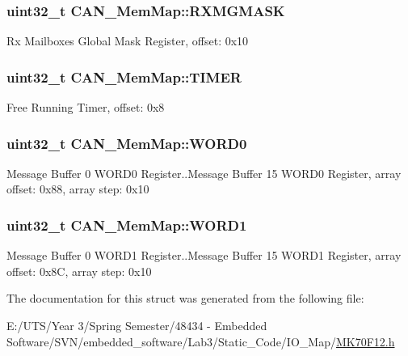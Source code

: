 \subsubsection[{R\+X\+M\+G\+M\+A\+S\+K}]{\setlength{\rightskip}{0pt plus 5cm}uint32\+\_\+t C\+A\+N\+\_\+\+Mem\+Map\+::\+R\+X\+M\+G\+M\+A\+S\+K}\label{struct_c_a_n___mem_map_aa788d49d34c42aeb411ed6b43f1a7c42}
Rx Mailboxes Global Mask Register, offset\+: 0x10 \hypertarget{struct_c_a_n___mem_map_a7cdd012a6030c4bf528cec65fddb71ca}{}
\subsubsection[{T\+I\+M\+E\+R}]{\setlength{\rightskip}{0pt plus 5cm}uint32\+\_\+t C\+A\+N\+\_\+\+Mem\+Map\+::\+T\+I\+M\+E\+R}\label{struct_c_a_n___mem_map_a7cdd012a6030c4bf528cec65fddb71ca}
Free Running Timer, offset\+: 0x8 \hypertarget{struct_c_a_n___mem_map_ac2b68cfbc9aeab141d20ae8bd73cd169}{}
\subsubsection[{W\+O\+R\+D0}]{\setlength{\rightskip}{0pt plus 5cm}uint32\+\_\+t C\+A\+N\+\_\+\+Mem\+Map\+::\+W\+O\+R\+D0}\label{struct_c_a_n___mem_map_ac2b68cfbc9aeab141d20ae8bd73cd169}
Message Buffer 0 W\+O\+R\+D0 Register..Message Buffer 15 W\+O\+R\+D0 Register, array offset\+: 0x88, array step\+: 0x10 \hypertarget{struct_c_a_n___mem_map_ae9343e0c532c0f3784d9960ffb8aa229}{}
\subsubsection[{W\+O\+R\+D1}]{\setlength{\rightskip}{0pt plus 5cm}uint32\+\_\+t C\+A\+N\+\_\+\+Mem\+Map\+::\+W\+O\+R\+D1}\label{struct_c_a_n___mem_map_ae9343e0c532c0f3784d9960ffb8aa229}
Message Buffer 0 W\+O\+R\+D1 Register..Message Buffer 15 W\+O\+R\+D1 Register, array offset\+: 0x8\+C, array step\+: 0x10 

The documentation for this struct was generated from the following file\+:\begin{DoxyCompactItemize}
\item 
E\+:/\+U\+T\+S/\+Year 3/\+Spring Semester/48434 -\/ Embedded Software/\+S\+V\+N/embedded\+\_\+software/\+Lab3/\+Static\+\_\+\+Code/\+I\+O\+\_\+\+Map/\hyperlink{_m_k70_f12_8h}{M\+K70\+F12.\+h}\end{DoxyCompactItemize}
